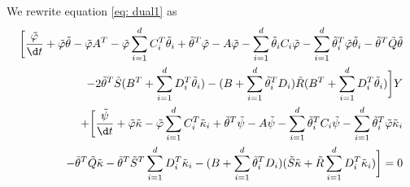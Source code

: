 We rewrite equation \eqref{eq: dual1} as
\begin{align}
    \bigg[ \frac{\tilde{\varphi}}{\d t} + \tilde{\varphi} \tilde{\theta} - \tilde{\varphi} A^T - \tilde{\varphi} \sum_{i=1}^d C_i^T \tilde{\theta}_i + \tilde{\theta}^T \tilde{\varphi} - A \tilde{\varphi} -\sum_{i=1}^d \tilde{\theta}_i C_i \tilde{\varphi} - \sum_{i=1}^d\tilde{\theta}_i^T\tilde{\varphi} \tilde{\theta}_i - \tilde{\theta}^T \tilde{Q}\tilde{\theta}\\
    - 2\tilde{\theta}^T \tilde{S}(B^T + \sum_{i=1}^d D_i^T \tilde{\theta}_i) - (B + \sum_{i=1}^d\tilde{\theta}_i^T D_i)\tilde{R} (B^T + \sum_{i=1}^d D_i^T \tilde{\theta}_i)\bigg]Y\\
    + \bigg[ \frac{\tilde{\psi}}{\d t} + \tilde{\varphi} \tilde{\kappa} - \tilde{\varphi} \sum_{i=1}^d C_i^T \tilde{\kappa}_i + \tilde{\theta}^T \tilde{\psi} - A \tilde{\psi} - \sum_{i=1}^d \tilde{\theta}_i^T C_i \tilde{\psi} - \sum_{i=1}^d \tilde{\theta}_i^T \tilde{\varphi} \tilde{\kappa}_i \\
    -\tilde{\theta}^T \tilde{Q} \tilde{\kappa} - \tilde{\theta}^T \tilde{S}^T\sum_{i=1}^d D_i^T\tilde{\kappa}_i - (B + \sum_{i=1}^d\tilde{\theta}_i^T D_i) (\tilde{S}\tilde{\kappa} + \tilde{R} \sum_{i=1}^d D_i^T \tilde{\kappa}_i)\bigg] = 0
\end{align}
